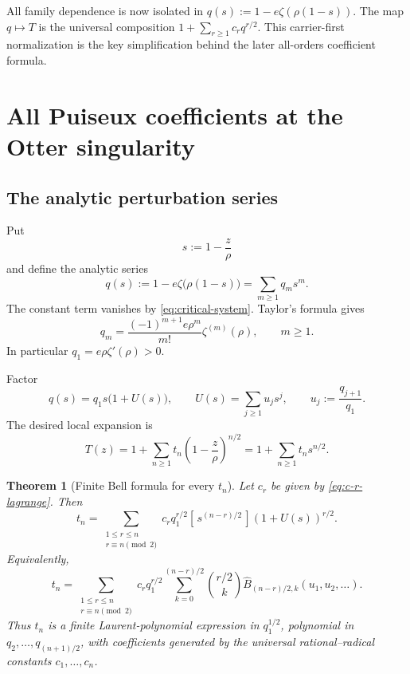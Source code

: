 \documentclass[11pt,oneside]{article}
\numberwithin{equation}{section}
\theoremstyle{plain}
\newtheorem{theorem}{Theorem}[section]
\theoremstyle{definition}
\theoremstyle{remark}
\newcommand{\Bhat}{\widehat{B}}
\newcommand{\Coeff}[2]{[\,#1^{#2}\,]}
\begin{document}
\begin{checkpointbox}
All family dependence is now isolated in $q(s):=1-e\zeta(\rho(1-s))$.
The map $q\mapsto T$ is the universal composition
$1+\sum_{r\ge1}c_rq^{r/2}$.  This carrier-first normalization is the key
simplification behind the later all-orders coefficient formula.
\end{checkpointbox}

\section{All Puiseux coefficients at the Otter singularity}\label{sec:puiseux}

\subsection{The analytic perturbation series}

Put
\begin{equation}\label{eq:s-local}
 s:=1-\frac{z}{\rho}
\end{equation}
and define the analytic series
\begin{equation}\label{eq:q-def}
 q(s):=1-e\zeta\bigl(\rho(1-s)\bigr)
      =\sum_{m\ge1}q_ms^m.
\end{equation}
The constant term vanishes by \eqref{eq:critical-system}.  Taylor's formula
gives
\begin{equation}\label{eq:q-derivative}
 \boxed{
 q_m=\frac{(-1)^{m+1}e\rho^m}{m!}\zeta^{(m)}(\rho),\qquad m\ge1.}
\end{equation}
In particular $q_1=e\rho\zeta'(\rho)>0$.

Factor
\begin{equation}\label{eq:q-factor}
 q(s)=q_1s\bigl(1+U(s)\bigr),\qquad
 U(s)=\sum_{j\ge1}u_js^j,\qquad u_j:=\frac{q_{j+1}}{q_1}.
\end{equation}
The desired local expansion is
\begin{equation}\label{eq:T-puiseux-def}
 T(z)=1+\sum_{n\ge1}t_n\left(1-\frac z\rho\right)^{n/2}
     =1+\sum_{n\ge1}t_ns^{n/2}.
\end{equation}

\begin{theorem}[Finite Bell formula for every $t_n$]\label{thm:t-n-formula}
Let $c_r$ be given by \eqref{eq:c-r-lagrange}.  Then
\begin{equation}\label{eq:t-n-coeff}
 \boxed{
 t_n=\sum_{\substack{1\le r\le n\\r\equiv n\pmod 2}}
 c_r q_1^{r/2}
 \Coeff{s}{(n-r)/2}(1+U(s))^{r/2}.}
\end{equation}
Equivalently,
\begin{equation}\label{eq:t-n-bell}
 \boxed{
 t_n=\sum_{\substack{1\le r\le n\\r\equiv n\pmod 2}}
 c_rq_1^{r/2}
 \sum_{k=0}^{(n-r)/2}\binom{r/2}{k}
 \Bhat_{(n-r)/2,k}(u_1,u_2,\ldots).}
\end{equation}
Thus $t_n$ is a finite Laurent-polynomial expression in $q_1^{1/2}$,
polynomial in $q_2,\ldots,q_{(n+1)/2}$, with coefficients generated by
the universal rational--radical constants $c_1,\ldots,c_n$.
\end{theorem}
\end{document}
